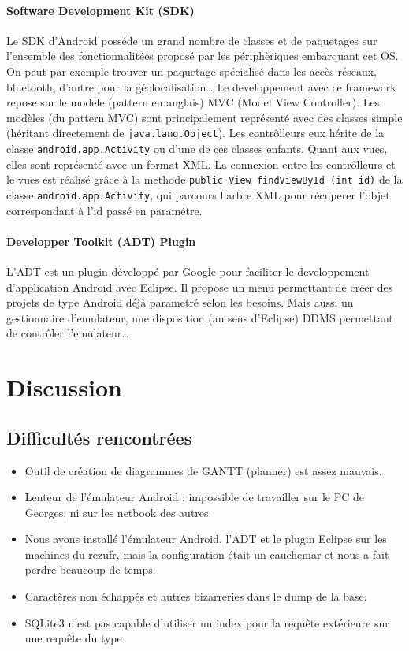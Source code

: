 \documentclass[a4paper,11pt,french]{article}
\def\android{Android\texttrademark{}}
\begin{document}
{\paragraph{Software Development Kit (SDK)}
Le SDK d'\android{} posséde un grand nombre de classes et de paquetages sur l'ensemble des fonctionnalitées proposé par les périphèriques embarquant cet OS. On peut par exemple trouver un paquetage spécialisé dans les accès réseaux, bluetooth, d'autre pour la géolocalisation\dots{} Le developpement avec ce framework repose sur le modele (pattern en anglais) MVC (Model View Controller). Les modèles (du pattern MVC) sont principalement représenté avec des classes simple (héritant directement de \verb!java.lang.Object!). Les contrôlleurs eux hérite de la classe \verb!android.app.Activity! ou d'une de ces classes enfants. Quant aux vues, elles sont représenté avec un format XML.
La connexion entre les contrôlleurs et le vues est réalisé grâce à la methode \verb!public View findViewById (int id)! de la classe \verb!android.app.Activity!, qui parcours l'arbre XML pour récuperer l'objet correspondant à l'id passé en paramétre.

\paragraph{Developper Toolkit (ADT) Plugin}
L'ADT est un plugin développé par Google pour faciliter le developpement d'application \android{} avec Eclipse. Il propose un menu permettant de créer des projets de type \android{} déjà parametré selon les besoins. Mais aussi un gestionnaire d'emulateur, une disposition (au sens d'Eclipse) DDMS permettant de contrôler l'emulateur\dots{}

\section{Discussion}
\subsection{Difficultés rencontrées}
\label{sec:difficultes}
\begin{itemize}
\item Outil de création de diagrammes de GANTT (planner) est assez mauvais.
\item Lenteur de l'émulateur \android{} : impossible de travailler sur le PC de Georges, ni sur les netbook des autres.
\item Nous avons installé l'émulateur \android{}, l'ADT et le plugin Eclipse sur les machines du rezufr, mais la configuration était un
  cauchemar et nous a fait perdre beaucoup de temps.
\item Caractères non échappés et autres bizarreries dans le dump de la base.
\item SQLite3 n'est pas capable d'utiliser un index pour la requête extérieure sur une requête du type


\end{itemize}}
\end{document}
